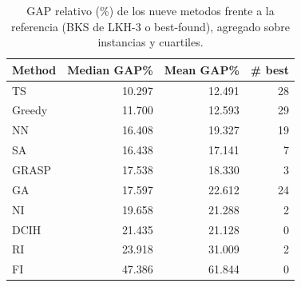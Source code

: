 \begin{table}[H]
\centering
\caption{GAP relativo (\%) de los nueve metodos frente a la referencia (BKS de LKH-3 o best-found), agregado sobre instancias y cuartiles.}
\label{tab:comparacion9}
\begin{tabular}{lrrr}
\hline
\textbf{Method} & \textbf{Median GAP\%} & \textbf{Mean GAP\%} & \textbf{\# best} \\ \hline
TS & 10.297 & 12.491 & 28 \\
Greedy & 11.700 & 12.593 & 29 \\
NN & 16.408 & 19.327 & 19 \\
SA & 16.438 & 17.141 & 7 \\
GRASP & 17.538 & 18.330 & 3 \\
GA & 17.597 & 22.612 & 24 \\
NI & 19.658 & 21.288 & 2 \\
DCIH & 21.435 & 21.128 & 0 \\
RI & 23.918 & 31.009 & 2 \\
FI & 47.386 & 61.844 & 0 \\
\hline
\end{tabular}
\end{table}
